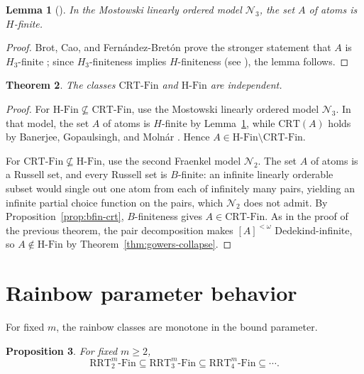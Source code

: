 \documentclass[10pt,a4paper]{amsart}
\newtheorem{theorem}{Theorem}[section]
\newtheorem{proposition}[theorem]{Proposition}
\newtheorem{lemma}[theorem]{Lemma}
\theoremstyle{definition}
\newcommand{\HFin}{\mathrm{H\text{-}Fin}}
\newcommand{\RRT}{\mathrm{RRT}}
\newcommand{\CRT}{\mathrm{CRT}}
\newcommand{\NN}{\mathcal{N}}
\newcommand{\RRTFin}[2]{\RRT^{#1}_{#2}\text{-}\mathrm{Fin}}
\newcommand{\CRTFin}{\CRT\text{-}\mathrm{Fin}}
\begin{document}
\begin{lemma}[{\cite[Proposition~4.17]{BCF}}]\label{lem:n3-hfin}
In the Mostowski linearly ordered model \(\NN_3\), the set \(A\) of atoms is \(H\)-finite.
\end{lemma}

\begin{proof}
Brot, Cao, and Fern\'andez-Bret\'on prove the stronger statement that \(A\) is \(H_3\)-finite \cite[Proposition~4.17]{BCF}; since \(H_3\)-finiteness implies \(H\)-finiteness (see \cite[Section~3]{BCF}), the lemma follows.
\end{proof}

\begin{theorem}\label{thm:crt-hfin-indep}
The classes \(\CRTFin\) and \(\HFin\) are independent.
\end{theorem}

\begin{proof}
For \(\HFin\not\subseteq\CRTFin\), use the Mostowski linearly ordered model \(\NN_3\).  In that model, the set \(A\) of atoms is \(H\)-finite by Lemma~\ref{lem:n3-hfin}, while \(\CRT(A)\) holds by Banerjee, Gopaulsingh, and Moln\'ar \cite[Theorem~4.8(2)]{BGM}.  Hence \(A\in\HFin\setminus\CRTFin\).

For \(\CRTFin\not\subseteq\HFin\), use the second Fraenkel model \(\NN_2\).  The set \(A\) of atoms is a Russell set, and every Russell set is \(B\)-finite: an infinite linearly orderable subset would single out one atom from each of infinitely many pairs, yielding an infinite partial choice function on the pairs, which \(\NN_2\) does not admit.  By Proposition~\ref{prop:bfin-crt}, \(B\)-finiteness gives \(A\in\CRTFin\).  As in the proof of the previous theorem, the pair decomposition makes \([A]^{<\omega}\) Dedekind-infinite, so \(A\notin\HFin\) by Theorem~\ref{thm:gowers-collapse}.
\end{proof}

\section{Rainbow parameter behavior}\label{sec:parameter}

For fixed \(m\), the rainbow classes are monotone in the bound parameter.

\begin{proposition}\label{prop:rrt-n-monotone}
For fixed \(m\geq 2\),
\[
    \RRTFin{m}{2}
    \subseteq
    \RRTFin{m}{3}
    \subseteq
    \RRTFin{m}{4}
    \subseteq\cdots.
\]
\end{proposition}
\end{document}
